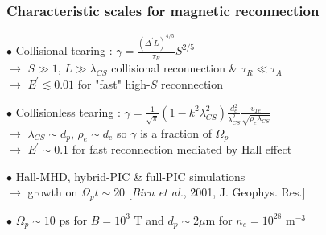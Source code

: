 \documentclass{beamer}
\newcommand{\D}{{\mathrm d}}
\begin{document}
\begin{frame}
\frametitle{Characteristic scales for magnetic reconnection}

$\bullet$ Collisional tearing : $\displaystyle \gamma = \frac{(\Delta^{\prime} L)^{4/5}}{\tau_R} S^{2/5}$ \\

$\to$ $S \gg 1$, $L \gg \lambda_{CS}$ collisional reconnection \& $\tau_R \ll \tau_A$ \\
$\to$ $E^{\prime} \lesssim 0.01$ for "fast" high-$S$ reconnection \\

\bigskip

$\bullet$ Collisionless tearing : $\displaystyle \gamma = \frac{1}{\sqrt{\pi}} (1 - k^2\lambda_{CS}^2) \frac{d_e^2}{\lambda_{CS}^2} \frac{v_{Te}}{\sqrt{\rho_e \lambda_{CS}}} $ \\

$\to$ $\lambda_{CS} \sim d_p$, $\rho_e \sim d_e$ so $\gamma$ is a fraction of $\Omega_p$ \\
$\to$ $E^{\prime} \sim 0.1$ for fast reconnection mediated by Hall effect \\

\bigskip

$\bullet$ Hall-MHD, hybrid-PIC \& full-PIC simulations \\
$\to$ growth on $\Omega_p t \sim 20$ [\textit{Birn et al.}, 2001, J. Geophys. Res.] \\

\bigskip

$\bullet$ $\Omega_p \sim 10$ ps for $B = 10^3$ T and $d_p \sim 2 \mu$m for $n_e = 10^{28}$ m$^{-3}$ \\

\end{frame}



\end{document}
